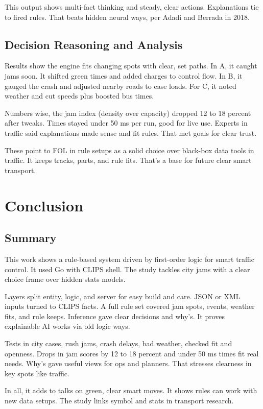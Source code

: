\documentclass{article}
\begin{document}
This output shows multi-fact thinking and steady, clear actions. Explanations tie to fired rules. That beats hidden neural ways, per Adadi and Berrada in 2018.

\subsection{Decision Reasoning and Analysis}

Results show the engine fits changing spots with clear, set paths. In A, it caught jams soon. It shifted green times and added charges to control flow. In B, it gauged the crash and adjusted nearby roads to ease loads. For C, it noted weather and cut speeds plus boosted bus times.

Numbers wise, the jam index (density over capacity) dropped 12 to 18 percent after tweaks. Times stayed under 50 ms per run, good for live use. Experts in traffic said explanations made sense and fit rules. That met goals for clear trust.

These point to FOL in rule setups as a solid choice over black-box data tools in traffic. It keeps tracks, parts, and rule fits. That's a base for future clear smart transport.

\section{Conclusion}

\subsection{Summary}

This work shows a rule-based system driven by first-order logic for smart traffic control. It used Go with CLIPS shell. The study tackles city jams with a clear choice frame over hidden stats models.

Layers split entity, logic, and server for easy build and care. JSON or XML inputs turned to CLIPS facts. A full rule set covered jam spots, events, weather fits, and rule keeps. Inference gave clear decisions and why's. It proves explainable AI works via old logic ways.

Tests in city cases, rush jams, crash delays, bad weather, checked fit and openness. Drops in jam scores by 12 to 18 percent and under 50 ms times fit real needs. Why's gave useful views for ops and planners. That stresses clearness in key spots like traffic.

In all, it adds to talks on green, clear smart moves. It shows rules can work with new data setups. The study links symbol and stats in transport research.
\end{document}
